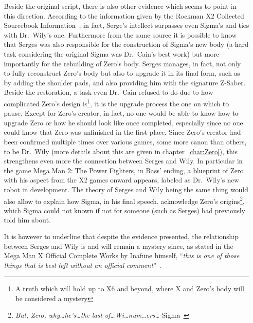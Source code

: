 Beside the original script, there is also other evidence which seems to point in this direction. According to the information given by the Rockman X2 Collected Sourcebook Information~\cite{wayback:X2_resources}, in fact, Serge's intellect surpasses even Sigma's and ties with Dr.~Wily's one. Furthermore from the same source it is possible to know that Serges was also responsible for the construction of Sigma's new body (a hard task considering the original Sigma was Dr.~Cain's best work) but more importantly for the rebuilding of Zero's body. Serges manages, in fact, not only to fully reconstruct Zero's body but also to upgrade it in its final form, such as by adding the shoulder pads, and also providing him with the signature Z-Saber. Beside the restoration, a task even Dr.~Cain refused to do due to how complicated Zero's design is\footnote{A truth which will hold up to X6 and beyond, where X and Zero's body will be considered a mystery}, it is the upgrade process the one on which to pause. Except for Zero's creator, in fact, no one would be able to know how to upgrade Zero or how he should look like once completed, especially since no one could know that Zero was unfinished in the first place. Since Zero's creator had been confirmed multiple times over various games, some more canon than others, to be Dr.~Wily (more details about this are given in chapter~\ref{char:Zero}), this strengthens even more the connection between Serges and Wily. In particular in the game Mega Man 2: The Power Fighters, in Bass' ending, a blueprint of Zero with his aspect from the X2 games onward appears, labeled as Dr.~Wily's new robot in development.  The theory of Serges and Wily being the same thing would also allow to explain how Sigma, in his final speech, acknowledge Zero's origins\footnote{\textit{But, Zero, why…he’s…the last of…Wi…num…ers…}-Sigma~\cite{wayback:X2_resources}}, which Sigma could not known if not for someone (such as Serges) had previously told him about.

It is however to underline that despite the evidence presented, the relationship between Serges and Wily is and will remain a mystery since, as stated in the Mega Man X Official Complete Works by Inafune himself, ``\textit{this is one of those things that is best left without an official comment}''~\cite{book:MMX_Complete_art}.
